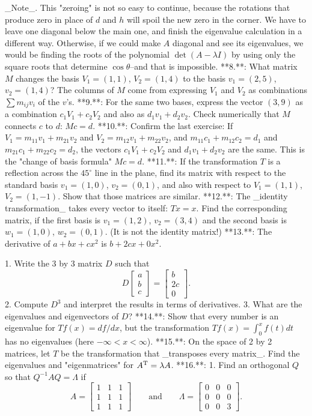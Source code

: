 _Note_. This "zeroing" is not so easy to continue, because the rotations that produce zero in place of \(d\) and \(h\) will spoil the new zero in the corner. We have to leave one diagonal below the main one, and finish the eigenvalue calculation in a different way. Otherwise, if we could make \(A\) diagonal and see its eigenvalues, we would be finding the roots of the polynomial \(\det(A-\lambda I)\) by using only the square roots that determine \(\cos\theta\)--and that is impossible.
**8.**: What matrix \(M\) changes the basis \(V_{1}=(1,1)\), \(V_{2}=(1,4)\) to the basis \(v_{1}=(2,5)\), \(v_{2}=(1,4)\)? The columns of \(M\) come from expressing \(V_{1}\) and \(V_{2}\) as combinations \(\sum m_{ij}v_{i}\) of the \(v\)'s.
**9.**: For the same two bases, express the vector \((3,9)\) as a combination \(c_{1}V_{1}+c_{2}V_{2}\) and also as \(d_{1}v_{1}+d_{2}v_{2}\). Check numerically that \(M\) connects \(c\) to \(d\): \(Mc=d\).
**10.**: Confirm the last exercise: If \(V_{1}=m_{11}v_{1}+m_{21}v_{2}\) and \(V_{2}=m_{12}v_{1}+m_{22}v_{2}\), and \(m_{11}c_{1}+m_{12}c_{2}=d_{1}\) and \(m_{21}c_{1}+m_{22}c_{2}=d_{2}\), the vectors \(c_{1}V_{1}+c_{2}V_{2}\) and \(d_{1}v_{1}+d_{2}v_{2}\) are the same. This is the "change of basis formula" \(Mc=d\).
**11.**: If the transformation \(T\) is a reflection across the \(45^{\circ}\) line in the plane, find its matrix with respect to the standard basis \(v_{1}=(1,0)\), \(v_{2}=(0,1)\), and also with respect to \(V_{1}=(1,1)\), \(V_{2}=(1,-1)\). Show that those matrices are similar.
**12.**: The _identity transformation_ takes every vector to itself: \(Tx=x\). Find the corresponding matrix, if the first basis is \(v_{1}=(1,2)\), \(v_{2}=(3,4)\) and the second basis is \(w_{1}=(1,0)\), \(w_{2}=(0,1)\). (It is not the identity matrix!)
**13.**: The derivative of \(a+bx+cx^{2}\) is \(b+2cx+0x^{2}\).

1. Write the 3 by 3 matrix \(D\) such that \[D\begin{bmatrix}a\\ b\\ c\end{bmatrix}=\begin{bmatrix}b\\ 2c\\ 0\end{bmatrix}.\]
2. Compute \(D^{3}\) and interpret the results in terms of derivatives.
3. What are the eigenvalues and eigenvectors of \(D\)?
**14.**: Show that every number is an eigenvalue for \(Tf(x)=df/dx\), but the transformation \(Tf(x)=\int_{0}^{x}f(t)dt\) has no eigenvalues (here \(-\infty<x<\infty\)).
**15.**: On the space of 2 by 2 matrices, let \(T\) be the transformation that _transposes every matrix_. Find the eigenvalues and "eigenmatrices" for \(A^{\rm T}=\lambda A\).
**16.**:
1. Find an orthogonal \(Q\) so that \(Q^{-1}AQ=\Lambda\) if \[A=\begin{bmatrix}1&1&1\\ 1&1&1\\ 1&1&1\end{bmatrix}\qquad\text{and}\qquad\Lambda=\begin{bmatrix}0&0&0\\ 0&0&0\\ 0&0&3\end{bmatrix}.\] 